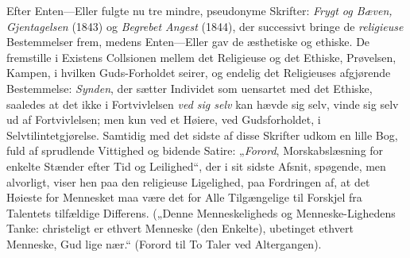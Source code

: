 \documentclass[12pt,a4paper]{book}
\begin{document}
Efter Enten---Eller fulgte nu tre mindre, pseudonyme Skrifter: \emph{Frygt
og Bæven, Gjentagelsen} (1843) og \emph{Begrebet Angest} (1844), der
successivt bringe de \emph{religieuse} Bestemmelser frem, medens
Enten---Eller gav de æsthetiske og ethiske. De fremstille i Existens
Collsionen mellem det Religieuse og det Ethiske, Prøvelsen, Kampen, i
hvilken Guds-Forholdet seirer, og endelig det Religieuses afgjørende
Bestemmelse: \emph{Synden}, der sætter Individet som uensartet med det
Ethiske, saaledes at det ikke i Fortvivlelsen \emph{ved sig selv} kan hævde
sig selv, vinde sig selv ud af Fortvivlelsen; men kun ved et Høiere, ved
Gudsforholdet, i Selvtilintetgjørelse. Samtidig med det sidste af disse
Skrifter udkom en lille Bog, fuld af sprudlende Vittighed og bidende Satire:
„\emph{Forord}, Morskabslæsning for enkelte Stænder efter Tid og
Leilighed“, der i sit sidste Afsnit, spøgende, men alvorligt, viser hen paa
den religieuse Ligelighed, paa Fordringen af, at det Høieste for Mennesket
maa være det for Alle Tilgængelige til Forskjel fra Talentets tilfældige
Differens.
(„Denne Menneskeligheds og Menneske-Lighedens Tanke: christeligt er ethvert
Menneske (den Enkelte), ubetinget ethvert Menneske, Gud lige nær.“ (Forord
til To Taler ved Altergangen).
\end{document}

